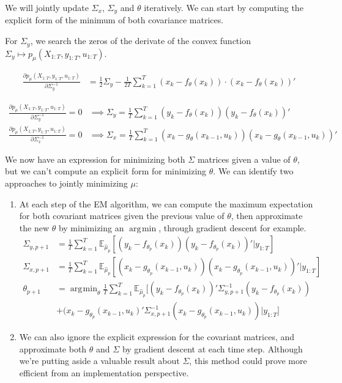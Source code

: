 \documentclass[10pt,a4paper]{report}
\DeclareMathOperator*{\argmin}{\arg\!\min}
\begin{document}
We will jointly update $\Sigma_x$, $\Sigma_y$ and $\theta$ iteratively. We can start by computing the explicit form of the minimum of both covariance matrices.

For $\Sigma_y$, we search the zeros of the derivate of the convex function $\Sigma_y \mapsto p_{\mu}(X_{1:T}, y_{1:T}, u_{1:T})$.

\begin{align*}
    \frac{\partial p_{\mu}(X_{1:T}, y_{1:T}, u_{1:T})}{\partial \Sigma_y^{-1}} & = \frac{1}{2} \Sigma_y - \frac{1}{2T} \sum_{k=1}^T (x_k - f_{\theta}(x_{k})) \cdot (x_k - f_{\theta}(x_{k}))'
\end{align*}

\begin{align*}
    \frac{\partial p_{\mu}(X_{1:T}, y_{1:T}, u_{1:T})}{\partial \Sigma_y^{-1}} = 0 & \implies \Sigma_y = \frac{1}{T}\sum_{k=1}^T (y_k - f_{\theta}(x_k))(y_k - f_{\theta}(x_k))'                   \\
    \frac{\partial p_{\mu}(X_{1:T}, y_{1:T}, u_{1:T})}{\partial \Sigma_x^{-1}} = 0 & \implies \Sigma_x = \frac{1}{T}\sum_{k=1}^T (x_k - g_{\theta}(x_{k-1}, u_k))(x_k - g_{\theta}(x_{k-1}, u_k))'
\end{align*}


We now have an expression for minimizing both $\Sigma$ matrices given a value of $\theta$, but we can't compute an explicit form for minimizing $\theta$. We can identify two approaches to jointly minimizing $\mu$:
\begin{enumerate}
    \item At each step of the EM algorithm, we can compute the maximum expectation for both covariant matrices given the previous value of $\theta$, then approximate the new $\theta$ by minimizing an $\argmin$, through gradient descent for example.
          \begin{align*}
              \Sigma_{y, p+1} & = \frac{1}{T}\sum_{k=1}^T \mathbb{E}_{\hat \mu_p} \left[ (y_k - f_{\theta_p}(x_k))(y_k - f_{\theta_p}(x_k))' | y_{1:T} \right]                   \\
              \Sigma_{x, p+1} & = \frac{1}{T}\sum_{k=1}^T \mathbb{E}_{\hat \mu_p} \left[ (x_k - g_{\theta_p}(x_{k-1}, u_k))(x_k - g_{\theta_p}(x_{k-1}, u_k))' | y_{1:T} \right] \\
              \theta_{p+1}    & = \argmin_{\theta} \frac{1}{T}\sum_{k=1}^T \mathbb{E}_{\hat \mu_p} [ (y_k - f_{\theta_p}(x_k))' \Sigma_{y, p+1}^{-1} (y_k - f_{\theta_p}(x_k))   \\
                              & + (x_k - g_{\theta_p}(x_{k-1}, u_k)'\Sigma_{x, p+1}^{-1}(x_k - g_{\theta_p}(x_{k-1}, u_k)) | y_{1:T} ]
          \end{align*}
    \item We can also ignore the explicit expression for the covariant matrices, and approximate both $\theta$ and $\Sigma$ by gradient descent at each time step. Although we're putting aside a valuable result about $\Sigma$, this method could prove more efficient from an implementation perspective.
\end{enumerate}
\end{document}
